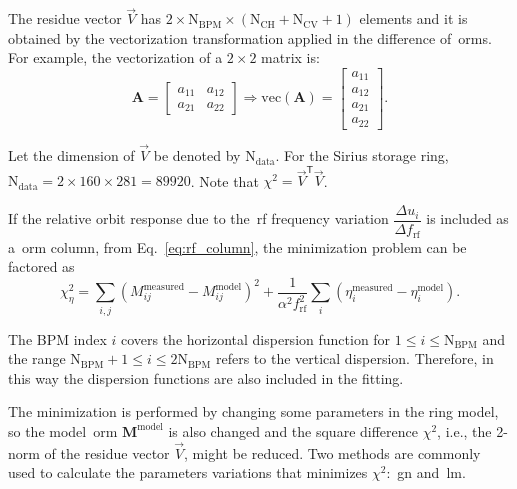 The residue vector $\vec{V}$ has $2 \times \mathrm{N}_{\mathrm{BPM}} \times \left(\mathrm{N}_{\mathrm{CH}} + \mathrm{N}_{\mathrm{CV}}+1\right)$ elements and it is obtained by the vectorization transformation applied in the difference of~\gls{orm}s. For example, the vectorization of a $2 \times 2$ matrix is:
\begin{equation}
        \mathbf{A} = \begin{bmatrix}
     a_{11} & a_{12} \\
     a_{21} & a_{22} 
\end{bmatrix} \Rightarrow \mathrm{vec}\left(\mathbf{A}\right) = \begin{bmatrix}
     a_{11}  \\
     a_{12} \\
     a_{21} \\ 
     a_{22} 
\end{bmatrix}.
\end{equation}

Let the dimension of $\vec{V}$ be denoted by $\mathrm{N}_{\mathrm{data}}$. For the Sirius storage ring, $\mathrm{N}_{\mathrm{data}} = 2 \times 160 \times 281 = 89920$. Note that $\chi^2 = \vec{V}^{\mathsf{T}}\vec{V}$.

If the relative orbit response due to the~\gls{rf} frequency variation $\dfrac{\Delta u_i}{\Delta f_{\mathrm{rf}}}$ is included as a~\gls{orm} column, from Eq.~\eqref{eq:rf_column}, the minimization problem can be factored as
\begin{equation}
    \chi^2_{\eta} = \sum_{i, j} \left(M^{\mathrm{measured}}_{ij} - M^{\mathrm{model}}_{ij}\right)^2 + \dfrac{1}{\alpha^2 f_{\mathrm{rf}}^2}\sum_{i}\left(\eta^{\mathrm{measured}}_{i} - \eta^{\mathrm{model}}_{i}\right).
    \label{eq:chi2_disp}
\end{equation}

The BPM index $i$ covers the horizontal dispersion function for $1 \leq i \leq \mathrm{N}_{\mathrm{BPM}}$ and the range $\mathrm{N}_{\mathrm{BPM}}+1 \leq i \leq 2\mathrm{N}_{\mathrm{BPM}}$ refers to the vertical dispersion. Therefore, in this way the dispersion functions are also included in the fitting.

The minimization is performed by changing some parameters in the ring model, so the model~\gls{orm} $\mathbf{M}^{\mathrm{model}}$ is also changed and the square difference $\chi^2$, i.e., the 2-norm of the residue vector $\vec{V}$, might be reduced. Two methods are commonly used to calculate the parameters variations that minimizes $\chi^2$:~\gls{gn} and~\gls{lm}.

